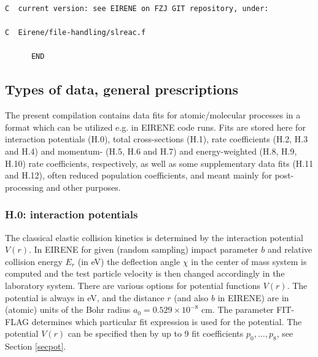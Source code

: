 \documentclass[12pt,dvipdfmx]{article}
\begin{document}
\begin{small}
\begin{verbatim}
C  current version: see EIRENE on FZJ GIT repository, under:

C  Eirene/file-handling/slreac.f

      END
\end{verbatim}\end{small}
\newpage

\subsection{Types of data, general prescriptions}\label{sec1.3}
The present compilation contains data fits for atomic/molecular processes in a format which can be utilized e.g. in EIRENE code runs.
Fits are stored here for interaction potentials (H.0), total cross-sections (H.1),
rate coefficients (H.2, H.3 and H.4) and momentum- (H.5, H.6 and H.7) and
energy-weighted (H.8, H.9, H.10) rate coefficients, respectively, as well as some
supplementary data fits (H.11 and H.12), often reduced population coefficients,
and meant mainly for post-processing and other purposes.

\setcounter{subsubsection}{-1}
\subsubsection{H.0: interaction potentials}\label{sec1.3.0}
The classical elastic collision kinetics is determined by the
interaction potential $V(r)$. In EIRENE for given (random sampling)
impact parameter $b$ and relative collision energy $E_r$ (in eV) the
deflection angle $\chi$ in the center of mass system is computed and
the test particle velocity is then changed accordingly in the
laboratory system. There are various options for potential functions
$V(r)$. The potential is always in eV, and the distance $r$ (and
also $b$ in EIRENE) are in (atomic) units of the Bohr radius
$a_0=0.529 \times 10^{-8}$ cm. The parameter FIT-FLAG determines
which particular fit expression is used for the potential. The
potential $V(r)$ can be specified then by up
to 9 fit coefficients $p_0,\dots,p_8$, see Section \ref{secpot}.\\
\end{document}
